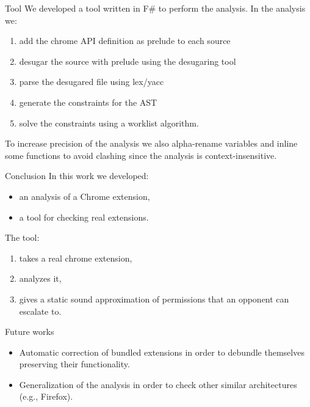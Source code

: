 \documentclass[11pt]{beamer}
\begin{document}
\begin{frame}{Tool}
We developed a tool written in F\# to perform the analysis. In the analysis we:
\begin{enumerate}
\item add the chrome API definition as prelude to each source
\item desugar the source with prelude using the desugaring tool \cite{LambdaJS}
\item parse the desugared file using lex/yacc
\item generate the constraints for the AST
\item solve the constraints using a worklist algorithm.
\end{enumerate}
To increase precision of the analysis we also alpha-rename variables and inline some functions to avoid clashing since the analysis is context-insensitive.
\end{frame}

\begin{frame}{Conclusion}
In this work we developed:
\begin{itemize}
\item an analysis of a Chrome extension,
\item a tool for checking real extensions.
\end{itemize}

The tool:
\begin{enumerate}
\item takes a real chrome extension,
\item analyzes it,
\item gives a static sound approximation of permissions that an opponent can escalate to.
\end{enumerate}
\end{frame}

\begin{frame}{Future works}
\begin{itemize}
\item Automatic correction of bundled extensions in order to debundle themselves preserving their functionality.
\item Generalization of the analysis in order to check other similar architectures (e.g., Firefox).
\end{itemize}
\end{frame}
\end{document}
